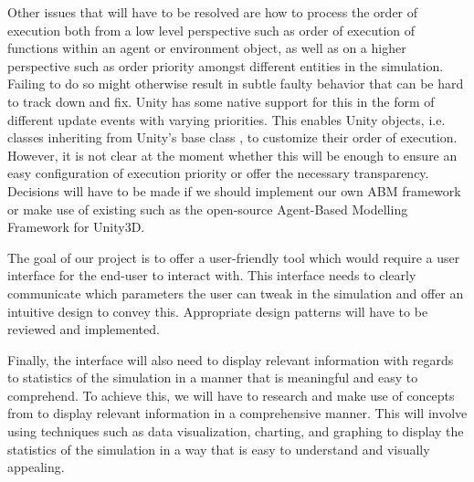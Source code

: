 Other issues that will have to be resolved are how to process the order of execution both from a low level perspective such as order of execution of functions within an agent or environment object, as well as on a higher perspective such as order priority amongst different entities in the simulation. Failing to do so might otherwise result in subtle faulty behavior that can be hard to track down and fix. Unity has some native support for this in the form of different update events with varying priorities. This enables Unity objects, i.e. classes inheriting from Unity's base class , to customize their order of execution. However, it is not clear at the moment whether this will be enough to ensure an easy configuration of execution priority or offer the necessary transparency. Decisions will have to be made if we should implement our own ABM framework or make use of existing  such as the open-source Agent-Based Modelling Framework for Unity3D\cite{abmu}.

The goal of our project is to offer a user-friendly tool which would require a user interface for the end-user to interact with. This interface needs to clearly communicate which parameters the user can tweak in the simulation and offer an intuitive design to convey this. Appropriate  design patterns will have to be reviewed and implemented.

Finally, the interface will also need to display relevant information with regards to statistics of the simulation in a manner that is meaningful and easy to comprehend. To achieve this, we will have to research and make use of concepts from  to display relevant information in a comprehensive manner. This will involve using techniques such as data visualization, charting, and graphing to display the statistics of the simulation in a way that is easy to understand and visually appealing.